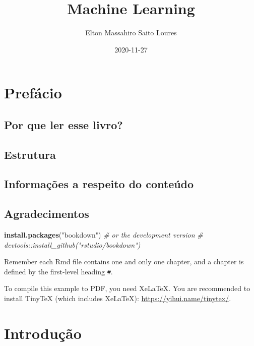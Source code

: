 \documentclass[
]{book}
\title{Machine Learning}
\author{Elton Massahiro Saito Loures}
\date{2020-11-27}
\newenvironment{Shaded}{\begin{snugshade}}{\end{snugshade}}
\newcommand{\CommentTok}[1]{\textcolor[rgb]{0.56,0.35,0.01}{\textit{#1}}}
\newcommand{\KeywordTok}[1]{\textcolor[rgb]{0.13,0.29,0.53}{\textbf{#1}}}
\newcommand{\NormalTok}[1]{#1}
\newcommand{\StringTok}[1]{\textcolor[rgb]{0.31,0.60,0.02}{#1}}
\begin{document}
\maketitle

{
\setcounter{tocdepth}{1}
\tableofcontents
}
\hypertarget{prefuxe1cio}{%
\chapter*{Prefácio}\label{prefuxe1cio}}

\hypertarget{por-que-ler-esse-livro}{%
\section{Por que ler esse livro?}\label{por-que-ler-esse-livro}}

\hypertarget{estrutura}{%
\section{Estrutura}\label{estrutura}}

\hypertarget{informauxe7uxf5es-a-respeito-do-conteuxfado}{%
\section{Informações a respeito do conteúdo}\label{informauxe7uxf5es-a-respeito-do-conteuxfado}}

\hypertarget{agradecimentos}{%
\section{Agradecimentos}\label{agradecimentos}}

\begin{Shaded}
\begin{Highlighting}[]
\KeywordTok{install.packages}\NormalTok{(}\StringTok{"bookdown"}\NormalTok{)}
\CommentTok{# or the development version}
\CommentTok{# devtools::install_github("rstudio/bookdown")}
\end{Highlighting}
\end{Shaded}

Remember each Rmd file contains one and only one chapter, and a chapter is defined by the first-level heading \texttt{\#}.

To compile this example to PDF, you need XeLaTeX. You are recommended to install TinyTeX (which includes XeLaTeX): \url{https://yihui.name/tinytex/}.

\hypertarget{intro}{%
\chapter{Introdução}\label{intro}}
\end{document}
